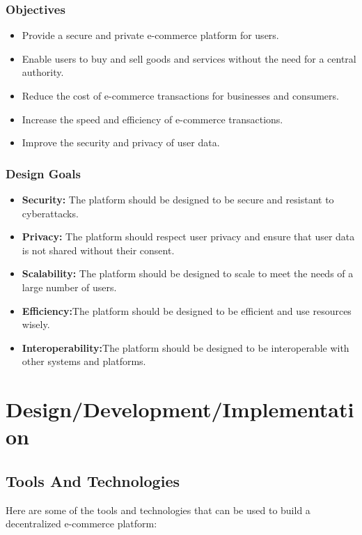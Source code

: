 \documentclass{report}
\begin{document}
\subsection{Objectives}
\begin{itemize}
    \item Provide a secure and private e-commerce platform for users.
    \item Enable users to buy and sell goods and services without the need for a central authority.
    \item Reduce the cost of e-commerce transactions for businesses and consumers.
    \item Increase the speed and efficiency of e-commerce transactions.
    \item Improve the security and privacy of user data.
\end{itemize}
\subsection{Design Goals}
\begin{itemize}
    \item \textbf{Security:} The platform should be designed to be secure and resistant to cyberattacks.
    \item \textbf{Privacy:} The platform should respect user privacy and ensure that user data is not shared without their consent.
    \item \textbf{Scalability:} The platform should be designed to scale to meet the needs of a large number of users.
     \item \textbf{Efficiency:}The platform should be designed to be efficient and use resources wisely.
     \item \textbf{Interoperability:}The platform should be designed to be interoperable with other systems and platforms.
    
\end{itemize}
\newpage
\chapter{Design/Development/Implementation}

\section{Tools And Technologies}
Here are some of the tools and technologies that can be used to build a decentralized e-commerce platform:
\end{document}

